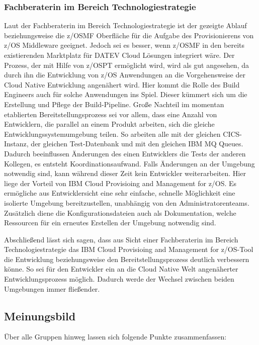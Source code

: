 \subsubsection{Fachberaterin im Bereich Technologiestrategie}
Laut der Fachberaterin im Bereich Technologiestrategie ist der gezeigte Ablauf beziehungsweise die z/OSMF Oberfläche für die Aufgabe des Provisionierens von z/OS Middleware geeignet.
Jedoch sei es besser, wenn z/OSMF in den bereits existierenden \glqq Marktplatz\grqq{} für DATEV Cloud Lösungen integriert wäre.
Der Prozess, der mit Hilfe von z/OSPT ermöglicht wird, wird als gut angesehen, da durch ihn die Entwicklung von z/OS Anwendungen an die Vorgehensweise der Cloud Native Entwicklung angenähert wird.
Hier kommt die Rolle des Build Engineers auch für solche Anwendungen ins Spiel.
Dieser kümmert sich um die Erstellung und Pflege der Build-Pipeline.
Große Nachteil im momentan etablierten Bereitstellungsprozess sei vor allem,  dass eine Anzahl von Entwicklern, die parallel an einem Produkt arbeiten, sich die gleiche Entwicklungssystemumgebung teilen.
So arbeiten alle mit der gleichen CICS-Instanz, der gleichen Test-Datenbank und mit den gleichen IBM MQ Queues.
Dadurch beeinflussen Änderungen des einen Entwicklers die Tests der anderen Kollegen, es entsteht Koordinationsaufwand.
Falls Änderungen an der Umgebung notwendig sind, kann während dieser Zeit kein Entwickler weiterarbeiten.
Hier liege der Vorteil von \glqq IBM Cloud Provisioing and Management for z/OS\grqq.
Es ermögliche aus Entwicklersicht eine sehr einfache, schnelle Möglichkeit eine isolierte Umgebung bereitzustellen, unabhängig von den Administratorenteams.
Zusätzlich diene die Konfigurationsdateien auch als Dokumentation, welche Ressourcen für ein erneutes Erstellen der Umgebung notwendig sind.

Abschließend lässt sich sagen, dass aus Sicht einer Fachberaterin im Bereich Technologiestrategie das \glqq IBM Cloud Provisioing and Management for z/OS\grqq-Tool die Entwicklung beziehungsweise den Bereitstellungsprozess deutlich verbessern könne.
So sei für den Entwickler ein an die Cloud Native Welt angenäherter Entwicklungsprozess möglich.
Dadurch werde der Wechsel zwischen beiden Umgebungen immer fließender.

\subsection{Meinungsbild}
Über alle Gruppen hinweg lassen sich folgende Punkte zusammenfassen:


